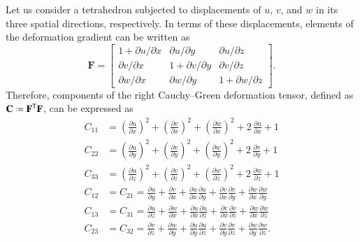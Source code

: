 Let us consider a tetrahedron subjected to displacements of $u$, $v$, and $w$ in its three spatial directions, respectively. In terms of these displacements, elements of the deformation gradient can be written as
\begin{equation}
\mathbf{F} =  
\begin{bmatrix}
1 +  {\partial u / \partial x} &  {\partial u / \partial y} &  {\partial u / \partial z} \\
 {\partial v / \partial x} & 1 +  {\partial v / \partial y} &  {\partial v / \partial z} \\
 {\partial w / \partial x} &  {\partial w / \partial y} & 1 +  {\partial w / \partial z}
\end{bmatrix} .
\end{equation}	
Therefore, components of the right Cauchy--Green deformation tensor, defined as $\mathbf{C} \defeq \mathbf{F}^\mathsf{T}\mathbf{F}$, can be expressed as
\begin{subequations}
    \begin{align}	
     {C_{11}} & = \left(\frac{ {\partial u}}{\partial x}\right)^2 + \left(\frac{ {\partial v}}{\partial x}\right)^2 + \left(\frac{ {\partial w}}{\partial x}\right)^2 + 2\, \frac{ {\partial u}}{\partial x}  + 1\\
     {C_{22}} & = \left(\frac{ {\partial u}}{\partial y}\right)^2 + \left(\frac{ {\partial v}}{\partial y}\right)^2 + \left(\frac{ {\partial w}}{\partial y}\right)^2 + 2\, \frac{ {\partial v}}{\partial y} + 1\\
     {C_{33}} & = \left(\frac{ {\partial u}}{\partial z}\right)^2 + \left(\frac{ {\partial v}}{\partial z}\right)^2 + \left(\frac{ {\partial w}}{\partial z}\right)^2 + 2\, \frac{ {\partial w}}{\partial z} + 1 \\
     {C_{12}} & =  {C_{21}} = \frac{ {\partial u}}{\partial y} + \frac{ {\partial v}}{\partial x} + \frac{ {\partial u}}{\partial x}  \frac{ {\partial u}}{\partial y} + \frac{ {\partial v}}{\partial x}  \frac{ {\partial v}}{\partial y} + \frac{ {\partial w}}{\partial x} \frac{ {\partial w}}{\partial y}\\
     {C_{13}} & =  {C_{31}} = \frac{ {\partial u}}{\partial z} + \frac{ {\partial w}}{\partial x} + \frac{ {\partial u}}{\partial x} \frac{ {\partial u}}{\partial z} + \frac{ {\partial v}}{\partial x} \frac{ {\partial v}}{\partial z} + \frac{ {\partial w}}{\partial x} \frac{ {\partial w}}{\partial z} \\
     {C_{23}} & =  {C_{32}} = \frac{ {\partial v}}{\partial z} + \frac{ {\partial w}}{\partial y} + \frac{ {\partial u}}{\partial y} \frac{ {\partial u}}{\partial z} + \frac{ {\partial v}}{\partial y}  \frac{ {\partial v}}{\partial z} + \frac{ {\partial w}}{\partial y}  \frac{ {\partial w}}{\partial z}.
    \end{align}
\end{subequations}
